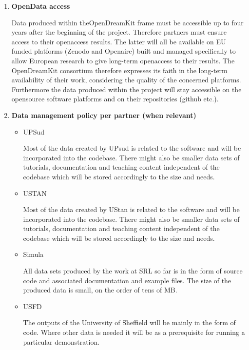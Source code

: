 \documentclass{../../Proposal/LaTeX-proposal/deliverablereport}
\begin{document}
\begin{enumerate}
\item\textbf{OpenData access}

Data produced within theOpenDreamKit frame must be accessible up to four years after the beginning of the project. Therefore partners must ensure access to their openaccess results.
The latter will all be available on EU funded platforms (Zenodo and Openaire) built and managed specifically to allow European research to give long-term openaccess to their results. The OpenDreamKit consortium therefore expresses its faith in the long-term availability of their work, considering the quality of the concerned platforms. Furthermore the data produced within the project will stay accessible on the opensource software platforms and on their repositories (github etc.).


\item\textbf{Data management policy per partner (when relevant)}
\begin{itemize}



\item{UPSud}

Most of the data created by UPsud is related to the software \Sage and will be incorporated into the \Sage codebase. There might also be smaller data sets of tutorials, documentation and teaching content independent of the \Sage codebase which will be stored accordingly to the size and needs.



\item{USTAN}

Most of the data created by UStan is related to the software \GAP and will be incorporated into the \GAP codebase. There might also be smaller data sets of tutorials, documentation and teaching content independent of the \GAP codebase which will be stored accordingly to the size and needs.



\item{Simula}

All data sets produced by the work at SRL so far is in the form of source code and associated documentation and example files. The size of the produced data is small, on the order of tens of MB.



\item{USFD}



The outputs of the University of Sheffield will be mainly in the form of code. Where other data is needed it will be as a prerequisite for running a particular demonstration. 
\end{itemize}
\end{enumerate}
\end{document}
